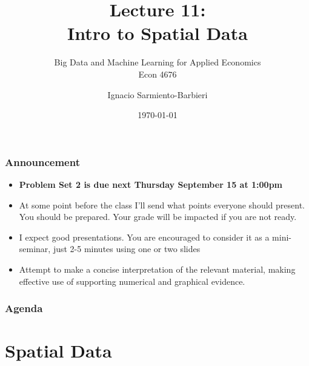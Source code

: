 \documentclass[
  shownotes,
  xcolor={svgnames},
  hyperref={colorlinks,citecolor=DarkBlue,linkcolor=DarkRed,urlcolor=DarkBlue}
   , aspectratio=169]{beamer}
\begin{document}
\title[Lecture 11]{Lecture 11: \\ Intro to Spatial Data}
\subtitle{Big Data and Machine Learning for Applied Economics \\ Econ 4676}
\date{\today}

\author[Sarmiento-Barbieri]{Ignacio Sarmiento-Barbieri}


\begin{frame}[noframenumbering]
\maketitle
\end{frame}



\begin{frame}
\frametitle{Announcement }


\begin{itemize} 
    \item {\bf Problem Set 2 is due next Thursday September 15 at 1:00pm} 
    \medskip
    \item At some point before the class I'll send what points everyone should present. You should be prepared. Your grade will be impacted if you are not ready. 
    \medskip
    \item  I expect good presentations. You are encouraged to consider it as a mini-seminar, just 2-5 minutes using one or two slides
    \medskip
    \item  Attempt to make a concise interpretation of the relevant material, making effective use of supporting numerical and graphical evidence.    
\end{itemize}
\end{frame}


\begin{frame}
\frametitle{Agenda}

\tableofcontents

\end{frame}




\section{Spatial Data }
\end{document}
